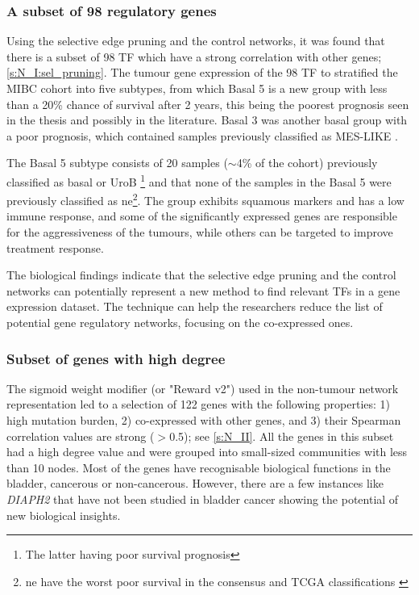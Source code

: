 \subsubsection*{A subset of 98 regulatory genes}

Using the selective edge pruning and the control networks, it was found that there is a subset of 98 TF which have a strong correlation with other genes; \cref{s:N_I:sel_pruning}. The tumour gene expression of the 98 TF to stratified the MIBC cohort into five subtypes, from which Basal 5 is a new group with less than a 20\% chance of survival after 2 years, this being the poorest prognosis seen in the thesis and possibly in the literature. Basal 3 was another basal group with a poor prognosis, which contained samples previously classified as \gls{MES-LIKE} \citep{Marzouka2018-ge}.

The Basal 5 subtype consists of 20 samples ($\sim$4\% of the cohort) previously classified as basal \citep{Kamoun2020-tj,Robertson2017-mg} or UroB \citep{Marzouka2018-ge}\footnote{The latter having poor survival prognosis} and that none of the samples in the Basal 5 were previously classified as \acrlong{ne}\footnote{\acrlong{ne} have the worst poor survival in the consensus and TCGA classifications \citep{Kamoun2020-tj,Robertson2017-mg}}. The group exhibits squamous markers and has a low immune response, and some of the significantly expressed genes are responsible for the aggressiveness of the tumours, while others can be targeted to improve treatment response.

The biological findings indicate that the selective edge pruning and the control networks can potentially represent a new method to find relevant \gls{TF}s in a gene expression dataset. The technique can help the researchers reduce the list of potential gene regulatory networks, focusing on the co-expressed ones.

\subsubsection*{Subset of genes with high degree}

The sigmoid weight modifier (or "Reward v2") used in the non-tumour network representation led to a selection of 122 genes with the following properties: 1) high mutation burden, 2) co-expressed with other genes, and 3) their Spearman correlation values are strong (\(>\)0.5); see \cref{s:N_II}. All the genes in this subset had a high degree value and were grouped into small-sized communities with less than 10 nodes. Most of the genes have recognisable biological functions in the bladder, cancerous or non-cancerous. However, there are a few instances like \textit{DIAPH2} that have not been studied in bladder cancer showing the potential of new biological insights.

